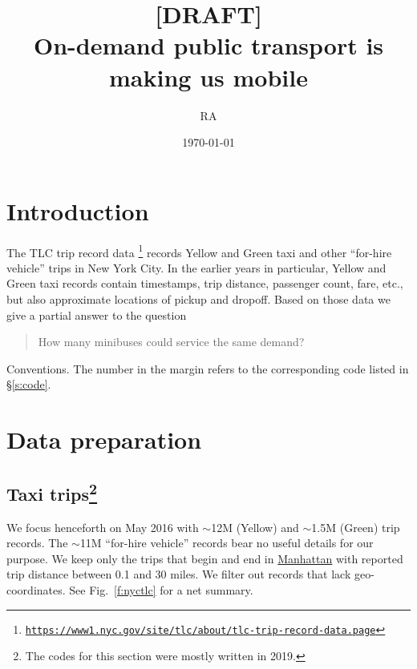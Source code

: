 \documentclass[12pt,notitlepage]{article}
\title{%
	[DRAFT]\\%
	On-demand public transport is making us mobile
}
\author{RA}
\date{\today}
\begin{document}
\maketitle

\section{Introduction}

The TLC trip record data%
\footnote{\href{https://www1.nyc.gov/site/tlc/about/tlc-trip-record-data.page}{\texttt{https://www1.nyc.gov/site/tlc/about/tlc-trip-record-data.page}}}
records 
Yellow and Green taxi
and other ``for-hire vehicle''
trips 
in New York City.
%
In the earlier years in particular,
Yellow and Green taxi records
contain timestamps,
trip distance, 
passenger count,
fare, etc.,
but also
approximate locations of pickup and dropoff.
%
%
Based on those data
we give a partial answer to the question
\begin{quote}
	How many minibuses could service the same demand?
\end{quote}

%



%

Conventions.
%
%
The number in the margin refers to the corresponding code listed in \S\ref{s:code}.


%

\section{Data preparation}

\subsection{Taxi trips\footnote{\label{f:oldcode}The codes for this section were mostly written in 2019.}}

\label{s:trips}

We focus henceforth on May 2016
with
$\sim$12M (Yellow) and $\sim$1.5M (Green)
trip records.
%
The $\sim$11M ``for-hire vehicle'' records
bear no useful details for our purpose.
%
%
%
We keep only 
the trips that begin and end in \href{https://www.openstreetmap.org/search?query=manhattan}{Manhattan}
with
reported trip distance between 0.1 and 30 miles.
%
We filter out records that
lack geo-coordinates.
%
%
See Fig.~\ref{f:nyctlc} for a net summary.
%
%
\end{document}
